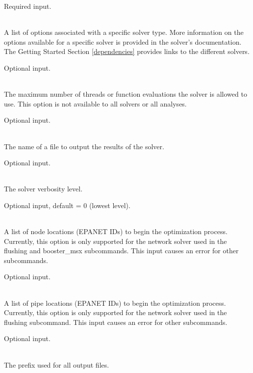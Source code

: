 \begin{description}[topsep=0pt,parsep=0.5em,itemsep=-0.4em]
\begin{description}[topsep=0pt,parsep=0.5em,itemsep=-0.4em]
                Required input.
    \item[{options}]\hfill
\\A list of options associated with a specific solver type. More
            information on the options available for a specific solver
            is provided in the solver's documentation. The Getting
            Started Section \ref{dependencies} provides links to the
            different solvers.
            
            Optional input.
    \item[{threads}]\hfill
\\The maximum number of threads or function evaluations the solver is
                allowed to use.  This option is not available to all solvers or all analyses.
                
                Optional input.
    \item[{logfile}]\hfill
\\The name of a file to output the results of the solver.
                
                Optional input.
    \item[{verbose}]\hfill
\\The solver verbosity level.
                
                Optional input, default = 0 (lowest level).
    \item[{initial points}]\hfill
    \begin{description}[topsep=0pt,parsep=0.5em,itemsep=-0.4em]
      \item[{nodes}]\hfill
\\A list of node locations (EPANET IDs) to begin the optimization
        process. Currently, this option is only supported for the
        network solver used in the flushing and booster\_msx
        subcommands. This input causes an error for other subcommands.
        
        Optional input.
      \item[{pipes}]\hfill
\\A list of pipe locations (EPANET IDs) to begin the optimization
        process. Currently, this option is only supported for the
        network solver used in the flushing subcommand. This input causes an error for other subcommands.
        
        Optional input.
    \end{description}
  \end{description}
  \item[{configure}]\hfill
  \begin{description}[topsep=0pt,parsep=0.5em,itemsep=-0.4em]
    \item[{output prefix}]\hfill
\\The prefix used for all output files.
                

\end{description}
\end{description}
